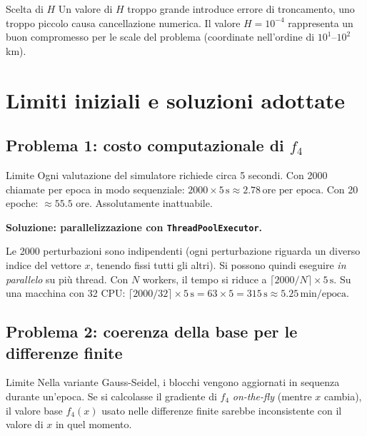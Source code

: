 \documentclass[12pt,a4paper]{article}
\theoremstyle{definition}
\begin{document}
\begin{warnbox}{Scelta di $H$}
Un valore di $H$ troppo grande introduce errore di troncamento, uno troppo piccolo causa
cancellazione numerica. Il valore $H = 10^{-4}$ rappresenta un buon compromesso per le scale
del problema (coordinate nell'ordine di $10^1$–$10^2$ km).
\end{warnbox}

\section{Limiti iniziali e soluzioni adottate}

\subsection{Problema 1: costo computazionale di $f_4$}

\begin{warnbox}{Limite}
Ogni valutazione del simulatore richiede circa 5 secondi.
Con 2000 chiamate per epoca in modo sequenziale:
$2000 \times 5\,\text{s} \approx 2.78\,\text{ore per epoca}$.
Con 20 epoche: $\approx 55.5$ ore. Assolutamente inattuabile.
\end{warnbox}

\textbf{Soluzione: parallelizzazione con \texttt{ThreadPoolExecutor}.}

Le 2000 perturbazioni sono indipendenti (ogni perturbazione riguarda un diverso indice del vettore
$x$, tenendo fissi tutti gli altri). Si possono quindi eseguire \emph{in parallelo} su più thread.
Con $N$ workers, il tempo si riduce a $\lceil 2000/N \rceil \times 5\,\text{s}$.
Su una macchina con 32 CPU: $\lceil 2000/32 \rceil \times 5\,\text{s} = 63 \times 5 = 315\,\text{s}
\approx 5.25\,\text{min/epoca}$.

\subsection{Problema 2: coerenza della base per le differenze finite}

\begin{warnbox}{Limite}
Nella variante Gauss-Seidel, i blocchi vengono aggiornati in sequenza durante un'epoca.
Se si calcolasse il gradiente di $f_4$ \emph{on-the-fly} (mentre $x$ cambia),
il valore base $f_4(x)$ usato nelle differenze finite sarebbe inconsistente con il valore
di $x$ in quel momento.
\end{warnbox}
\end{document}
